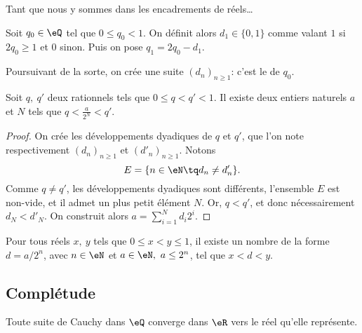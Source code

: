 Tant que nous y sommes dans les encadrements de réels\dots
\begin{normaltext}
  Soit \(q_0 \in \eQ \) tel que \( 0 \leq q_0 < 1 \). On définit alors \( d_1 \in \{0, 1\} \) comme valant \( 1 \) si \( 2 q_0 \geq 1 \) et \(0 \) sinon. Puis on pose \( q_1 = 2 q_0 - d_1 \).

  Poursuivant de la sorte, on crée une suite \( (d_n)_{n\geq 1} \): c'est le  de \( q_0 \).
\end{normaltext}

\begin{lemma}        \label{LEMooRSLIooVrZMxM}
  Soit \( q,\ q' \) deux rationnels tels que \( 0 \leq q < q' < 1 \). Il existe deux entiers naturels \( a \) et \( N \) tels que \( q < \frac a {2^N} < q' \).
\end{lemma}
\begin{proof}
  On crée les développements dyadiques de \( q \) et \( q' \), que l'on note respectivement \( (d_n)_{n\geq 1} \) et \( (d'_n)_{n\geq 1} \). Notons
  \begin{equation}
    E = \{ n \in \eN \tq d_n \neq d'_n \}.
  \end{equation}
Comme \( q \neq q' \), les développements dyadiques sont différents, l'ensemble \(E\) est non-vide, et il admet un plus petit élément \(N \). Or, \( q < q' \), et donc nécessairement \( d_N < d'_N \). On construit alors \( a = \sum_{i=1}^{N} d_i 2^i \). 
\end{proof}

\begin{corollary}\label{CorDensiteDyadiques}
  Pour tous réels \(x,\ y\) tels que \( 0 \leq x < y \leq 1 \), il existe un nombre de la forme \( d = a / 2^n \), avec \( n \in \eN \) et \( a \in \eN,\ a \leq 2^n\), tel que \( x < d < y \).
\end{corollary}


\subsection{Complétude}

\begin{lemma}      \label{LemooRTGFooYVstwS}
    Toute suite de Cauchy dans \( \eQ\) converge dans \( \eR\) vers le réel qu'elle représente.
\end{lemma}


